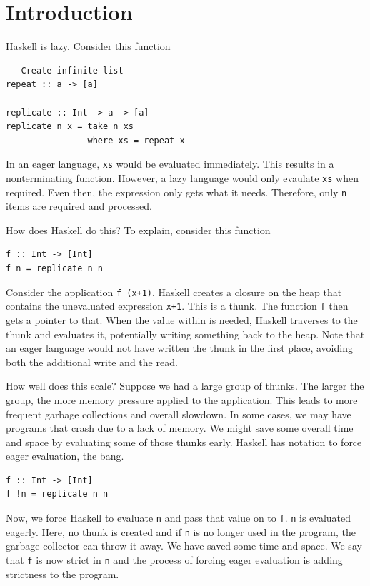 \documentclass[preprint,nocopyrightspace]{sigplanconf}
\begin{document}
\section{Introduction}\label{sec:intro}

Haskell is lazy. Consider this function
\begin{lstlisting}[label={lst:repl}]
-- Create infinite list
repeat :: a -> [a]

replicate :: Int -> a -> [a]
replicate n x = take n xs
                where xs = repeat x
\end{lstlisting}
In an eager language, \lstinline!xs! would be evaluated immediately. This results in a nonterminating function. However, a lazy language would only evaulate \lstinline!xs! when required. Even then, the expression only gets what it needs. Therefore, only \lstinline!n! items are required and processed.

How does Haskell do this? To explain, consider this function
\begin{lstlisting}[label={lst:f}]
f :: Int -> [Int]
f n = replicate n n
\end{lstlisting}
Consider the application \lstinline!f (x+1)!. Haskell creates a closure on the heap that contains the unevaluated expression \lstinline!x+1!. This is a thunk. The function \lstinline!f! then gets a pointer to that. When the value within is needed, Haskell traverses to the thunk and evaluates it, potentially writing something back to the heap. Note that an eager language would not have written the thunk in the first place, avoiding both the additional write and the read.

How well does this scale? Suppose we had a large group of thunks. The larger the group, the more memory pressure applied to the application. This leads to more frequent garbage collections and overall slowdown. In some cases, we may have programs that crash due to a lack of memory. We might save some overall time and space by evaluating some of those thunks early. Haskell has notation to force eager evaluation, the bang.
\begin{lstlisting}[label={lst:fstrict}]
f :: Int -> [Int]
f !n = replicate n n
\end{lstlisting}

Now, we force Haskell to evaluate \lstinline!n! and pass that value on to \lstinline!f!. \lstinline{n} is evaluated eagerly. Here, no thunk is created and if \lstinline{n} is no longer used in the program, the garbage collector can throw it away. We have saved some time and space. We say that \lstinline!f! is now strict in \lstinline!n! and the process of forcing eager evaluation is adding strictness to the program.
\end{document}
